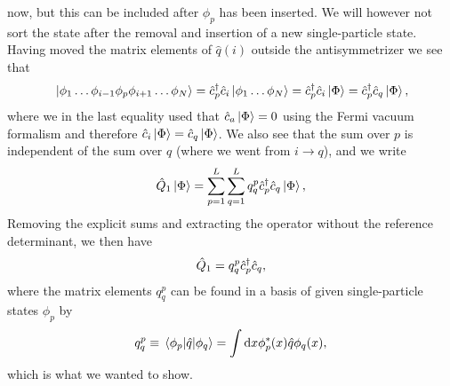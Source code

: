         now, but this can be included after $\phi_p$ has been inserted.
        We will however not sort the state after the removal and insertion of a
        new single-particle state.
        Having moved the matrix elements of $\hat{q}(i)$ outside the
        antisymmetrizer we see that
        \begin{align}
            \ket*{\phi_1\dots\phi_{i - 1}\phi_p\phi_{i + 1}\dots\phi_N}
            = \hat{c}_{p}^{\dagger}\hat{c}_{i}\ket*{\phi_1\dots\phi_N}
            = \hat{c}_{p}^{\dagger}\hat{c}_{i}\ket*{\Phi}
            = \hat{c}_{p}^{\dagger}\hat{c}_{q}\ket*{\Phi},
        \end{align}
        where we in the last equality used that $\hat{c}_{a}\ket*{\Phi} = 0$ using
        the Fermi vacuum formalism and therefore $\hat{c}_{i}\ket*{\Phi} =
        \hat{c}_{q}\ket*{\Phi}$.
        We also see that the sum over $p$ is independent of the sum over
        $q$ (where we went from $i \to q$), and we write
        \begin{align}
            \hat{Q}_1\ket*{\Phi}
            = \sum_{p = 1}^{L}\sum_{q = 1}^{L}q^{p}_{q}
            \hat{c}_{p}^{\dagger}\hat{c}_{q}\ket*{\Phi},
        \end{align}
        Removing the explicit sums and extracting the operator without the
        reference determinant, we then have
        \begin{align}
            \hat{Q}_1 = q^{p}_{q}\hat{c}_{p}^{\dagger}\hat{c}_{q},
        \end{align}
        where the matrix elements $q^{p}_{q}$ can be found in a basis of given
        single-particle states $\phi_p$ by
        \begin{align}
            q^{p}_{q}
            \equiv
            \mel*{\phi_p}{\hat{q}}{\phi_q}
            = \int\dd x\phi^{*}_{p}(x)\hat{q}\phi_{q}(x),
        \end{align}
        which is what we wanted to show.

